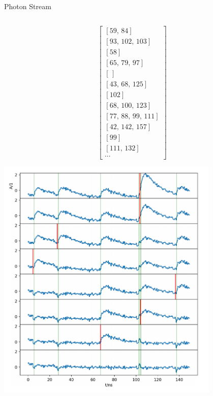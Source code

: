 \begin{frame}{Photon Stream}
  \begin{columns}[onlytextwidth]
      \begin{column}{0.475\textwidth}
        \begin{overprint}
        \begin{center}
          \vspace*{\fill}
          \vspace*{\fill}
        \begin{equation*}
            \begin{bmatrix}
                [59,\,84] \\
                 [93,\,102,\,103] \\
                 [58] \\
                 [65,\,79,\,97] \\
                 [\,] \\
                 [43,\,68,\,125] \\
                 [102] \\
                 [68,\,100,\,123] \\
                 [77,\,88,\,99,\,111] \\
                 [42,\,142,\,157] \\
                 [99] \\
                 [111,\,132] \\
                 \cdots
          \end{bmatrix}
      \end{equation*}
    \end{center}
            \vspace{\fill}\includegraphics[width=0.8\textwidth]{fig/photon_extraction_sebastian.png}

\end{overprint}
\end{column}
\end{columns}
\end{frame}
